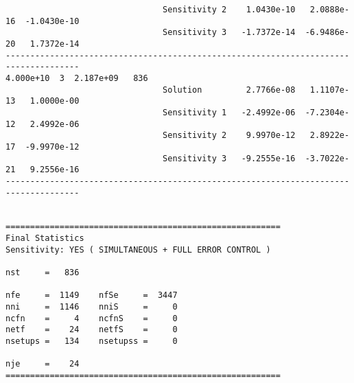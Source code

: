\begin{verbatim}
                                Sensitivity 2    1.0430e-10   2.0888e-16  -1.0430e-10 
                                Sensitivity 3   -1.7372e-14  -6.9486e-20   1.7372e-14 
-------------------------------------------------------------------------------------
4.000e+10  3  2.187e+09   836
                                Solution         2.7766e-08   1.1107e-13   1.0000e-00 
                                Sensitivity 1   -2.4992e-06  -7.2304e-12   2.4992e-06 
                                Sensitivity 2    9.9970e-12   2.8922e-17  -9.9970e-12 
                                Sensitivity 3   -9.2555e-16  -3.7022e-21   9.2556e-16 
-------------------------------------------------------------------------------------


========================================================
Final Statistics
Sensitivity: YES ( SIMULTANEOUS + FULL ERROR CONTROL )

nst     =   836

nfe     =  1149    nfSe     =  3447 
nni     =  1146    nniS     =     0 
ncfn    =     4    ncfnS    =     0 
netf    =    24    netfS    =     0 
nsetups =   134    nsetupss =     0 

nje     =    24
========================================================
\end{verbatim}